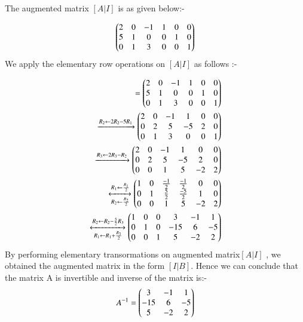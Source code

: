The augmented matrix $ [A | I]$ is as given below:- 

\begin{align}
\begin{pmatrix}
		 2 &0 &-1&  1 & 0 &  0 \\
		   5 &1 &0&  0 &  1 &  0 \\
		 0 &1 &3 &  0 &  0 &  1 \\
		 \end{pmatrix}
 \end{align}
 We apply the elementary row operations on $ [A | I]$ as follows :-
 
\begin{align}
 [A | I] = \myvec{
		 2 &0 &-1&  1 & 0 &  0 \\
		   5 &1 &0&  0 &  1 &  0 \\
		 0 &1 &3 &  0 &  0 &  1 \\
		 } \\
\xrightarrow{R_2\leftarrow 2R_2 - 5R_1} \myvec{
		 2 &0 &-1&  1 & 0 &  0 \\
		  0 &2 &5&  -5 &  2 &  0 \\
		 0 &1 &3 &  0 &  0 &  1 \\
		 } 
		 \\
 \xrightarrow{R_3\leftarrow 2R_3 - R_2} \myvec{
		 2 &0 &-1&  1 & 0 &  0 \\
		  0 &2 &5&  -5 &  2 &  0 \\
		 0 &0 &1 &  5 &  -2 &  2 \\
		 } \\
\xleftrightarrow[R_2\leftarrow \frac{R_2}{2}]{R_1\leftarrow \frac{R_1}{2}}\myvec{
		 1 & 0 & \frac{-1}{2} & \frac{-1}{2} & 0 &  0 \\
		  0 & 1 & \frac{5}{2} & \frac{-5}{2} &  1 &  0 \\
		 0 & 0 &1 &  5 &  -2 &  2 \\
		 } 	\\	 
\xleftrightarrow[R_1\leftarrow R_1  + \frac{R_3}{2}]{R_2\leftarrow R_2 - \frac{5}{2}R_3}\myvec{
		 1 & 0 & 0 & 3 & -1 &  1 \\
		  0 & 1 & 0 & -15 &  6 &  -5 \\
		 0 & 0 &1 &  5 &  -2 &  2 \\
		 } 		
\end{align}
By performing elementary transormations on augmented matrix$ [A | I]$ , we obtained the augmented matrix in the form $ [I|B]$. 
Hence we can conclude that the matrix A is invertible and inverse of the matrix is:-
\begin{align}
A^{-1} = \begin{pmatrix}
		  3 & -1 &  1 \\
		 -15 &  6 & -5 \\
		  5 &  -2 &  2 \\
		 \end{pmatrix}
\end{align}

